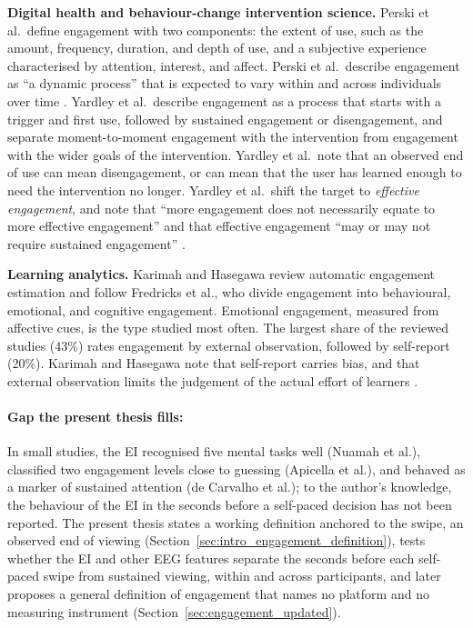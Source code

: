 \documentclass[12pt,a4paper]{report}
\begin{document}
\textbf{Digital health and behaviour-change intervention science.} Perski et al.\ define engagement with two components: the extent of use, such as the amount, frequency, duration, and depth of use, and a subjective experience characterised by attention, interest, and affect. Perski et al.\ describe engagement as ``a dynamic process'' that is expected to vary within and across individuals over time \cite{perski_conceptualising_2017}. Yardley et al.\ describe engagement as a process that starts with a trigger and first use, followed by sustained engagement or disengagement, and separate moment-to-moment engagement with the intervention from engagement with the wider goals of the intervention. Yardley et al.\ note that an observed end of use can mean disengagement, or can mean that the user has learned enough to need the intervention no longer. Yardley et al.\ shift the target to \emph{effective engagement}, and note that ``more engagement does not necessarily equate to more effective engagement'' and that effective engagement ``may or may not require sustained engagement'' \cite{yardley_understanding_2016}.

\textbf{Learning analytics.} Karimah and Hasegawa review automatic engagement estimation and follow Fredricks et al., who divide engagement into behavioural, emotional, and cognitive engagement. Emotional engagement, measured from affective cues, is the type studied most often. The largest share of the reviewed studies (43\%) rates engagement by external observation, followed by self-report (20\%). Karimah and Hasegawa note that self-report carries bias, and that external observation limits the judgement of the actual effort of learners \cite{karimah_automatic_2022}.

\paragraph{Gap the present thesis fills:} In small studies, the EI recognised five mental tasks well (Nuamah et al.), classified two engagement levels close to guessing (Apicella et al.), and behaved as a marker of sustained attention (de Carvalho et al.); to the author's knowledge, the behaviour of the EI in the seconds before a self-paced decision has not been reported. The present thesis states a working definition anchored to the swipe, an observed end of viewing (Section~\ref{sec:intro_engagement_definition}), tests whether the EI and other EEG features separate the seconds before each self-paced swipe from sustained viewing, within and across participants, and later proposes a general definition of engagement that names no platform and no measuring instrument (Section~\ref{sec:engagement_updated}).
\end{document}
